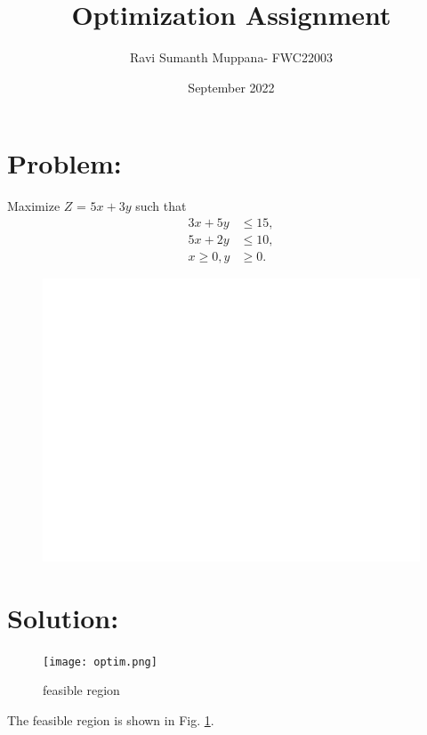 \documentclass[a4paper,12pt,twocolumn]{article}
\title{Optimization Assignment}
\author{Ravi Sumanth Muppana- FWC22003}
\date{September 2022}
\begin{document}
\maketitle
\section{Problem:}
\fi
Maximize $Z$ = $5x+3y$ such that 
\begin{align}
	3x+5y&\le15,
	\\
	5x+2y&\le10,
	\\
	x\ge0,y&\ge0.
\end{align}
\solution
\iffalse
	\begin{figure}[!ht]
		\centering
		\includegraphics[width=\columnwidth]{12/12/1/3/figs/optim.png}
		\caption{}
		\label{fig:12/12/1/3}
  	\end{figure}
\maketitle
\section{Solution:}
\begin{figure}[h]
\texttt{[image: optim.png]}
        \caption{feasible region}
\end{figure}
The feasible region is shown in Fig.
		\ref{fig:12/12/1/3}.
\end{document}
